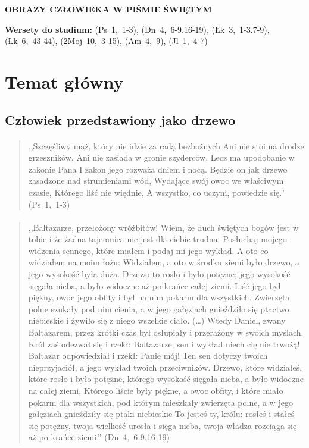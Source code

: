 \documentclass[10pt,a4paper,oneside]{article}
\begin{document}
\centerline{\textbf{\MakeUppercase{Obrazy człowieka w Piśmie Świętym}}}
\begin{center}
\textbf{Wersety do studium:} \mbox{(Ps 1, 1-3)}, \mbox{(Dn 4, 6-9.16-19)}, \mbox{(Łk 3, 1-3.7-9)}, \mbox{(Łk 6, 43-44)}, \mbox{(2Moj 10, 3-15)}, \mbox{(Am 4, 9)}, \mbox{(Jl 1, 4-7)}
\end{center}
\section{Temat główny}
\subsection{Człowiek przedstawiony jako drzewo}
\paragraph{}
\begin{quote}
,,Szczęśliwy mąż, który nie idzie za radą bezbożnych Ani nie stoi na drodze grzeszników, Ani nie zasiada w gronie szyderców, Lecz ma upodobanie w zakonie Pana I zakon jego rozważa dniem i nocą. Będzie on jak drzewo zasadzone nad strumieniami wód, Wydające swój owoc we właściwym czasie, Którego liść nie więdnie, A wszystko, co uczyni, powiedzie się.'' \mbox{(Ps 1, 1-3)}
\end{quote}
\paragraph{}
\begin{quote}
,,Baltazarze, przełożony wróżbitów! Wiem, że duch świętych bogów jest w tobie i że żadna tajemnica nie jest dla ciebie trudna. Posłuchaj mojego widzenia sennego, które miałem i podaj mi jego wykład. A oto co widziałem na moim łożu: Widziałem, a oto w środku ziemi było drzewo, a jego wysokość była duża. Drzewo to rosło i było potężne; jego wysokość sięgała nieba, a było widoczne aż po krańce całej ziemi. Liść jego był piękny, owoc jego obfity i był na nim pokarm dla wszystkich. Zwierzęta polne szukały pod nim cienia, a w jego gałęziach gnieździło się ptactwo niebieskie i żywiło się z niego wszelkie ciało. (\ldots) Wtedy Daniel, zwany Baltazarem, przez krótki czas był osłupiały i przerażony w swoich myślach. Król zaś odezwał się i rzekł: Baltazarze, sen i wykład niech cię nie trwożą! Baltazar odpowiedział i rzekł: Panie mój! Ten sen dotyczy twoich nieprzyjaciół, a jego wykład twoich przeciwników. Drzewo, które widziałeś, które rosło i było potężne, którego wysokość sięgała nieba, a było widoczne na całej ziemi, Którego liście były piękne, a owoc obfity, i które miało pokarm dla wszystkich, pod którym mieszkały zwierzęta polne, a w jego gałęziach gnieździły się ptaki niebieskie To jesteś ty, królu: rosłeś i stałeś się potężny, twoja wielkość urosła i sięga nieba, twoja władza rozciąga się aż po krańce ziemi.'' \mbox{(Dn 4, 6-9.16-19)}
\end{quote}
\end{document}
